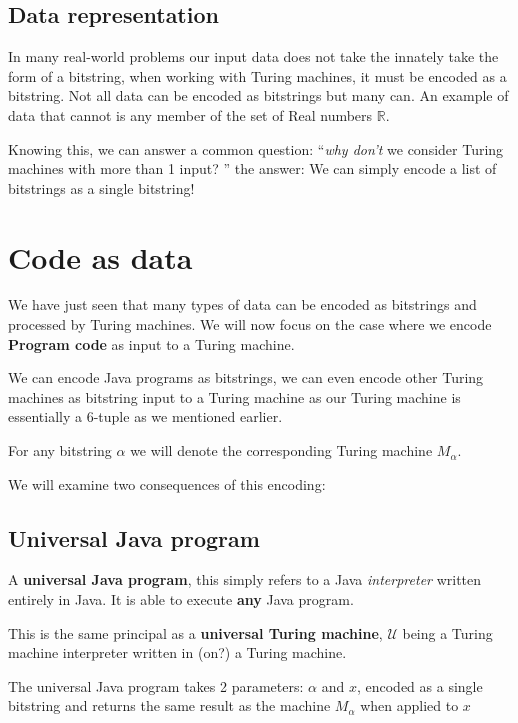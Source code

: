 \documentclass{article}
\begin{document}
    \subsection{Data representation}

    In many real-world problems our input data does not take the innately take the form of a bitstring, when working with Turing machines, it must be encoded as a bitstring. Not all data can be encoded as bitstrings but many can. An example of data that cannot is any member of the set of Real numbers $\mathbb{R}$.

    Knowing this, we can answer a common question: ``\textit{why don't} we consider Turing machines with more than 1 input? '' the answer: We can simply encode a list of bitstrings as a single bitstring!

    \section{Code as data}

    We have just seen that many types of data can be encoded as bitstrings and processed by Turing machines. We will now focus on the case where we encode \textbf{Program code} as input to a Turing machine.

    We can encode Java programs as bitstrings, we can even encode other Turing machines as bitstring input to a Turing machine as our Turing machine is essentially a 6-tuple as we mentioned earlier.

    For any bitstring $\alpha $ we will denote the corresponding Turing machine $M_{\alpha }$.

    We will examine two consequences of this encoding:

    \subsection{Universal Java program}

      A \textbf{universal Java program}, this simply refers to a Java \textit{interpreter} written entirely in Java. It is able to execute \textbf{any} Java program.

      This is the same principal as a \textbf{universal Turing machine}, $\mathcal{U}$ being a Turing machine interpreter written in (on?) a Turing machine.


      The universal Java program takes 2 parameters: $\alpha $ and $x$, encoded as a single bitstring and returns the same result as the machine $M_{\alpha }$ when applied to $x$
\end{document}
